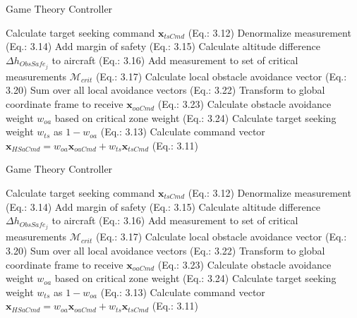 \begin{algorithm}
	\caption{Game Theory Controller}
	\begin{algorithmic}[1]
		\State Calculate target seeking command $\mathbf{x}_{tsCmd}$ (Eq.: 3.12)
		\State Denormalize measurement (Eq.: 3.14)
		\State Add margin of safety (Eq.: 3.15)
		\State Calculate altitude difference $\Delta h_{ObsSafe_{j}}$ to aircraft (Eq.: 3.16)
		\State Add measurement to set of critical measurements $\mathcal{M}_{crit}$ (Eq.: 3.17)
		\EndIf
		\EndFor
		\State Calculate local obstacle avoidance vector (Eq.: 3.20)
		\EndFor
		\State Sum over all local avoidance vectors (Eq.: 3.22)
		\State Transform to global coordinate frame to receive $\mathbf{x}_{oaCmd}$ (Eq.: 3.23)
		\State Calculate obstacle avoidance weight $w_{oa}$ based on critical zone weight (Eq.: 3.24)
		\State Calculate target seeking weight $w_{ts}$ as $1-w_{oa}$ (Eq.: 3.13)
		\State Calculate command vector $\mathbf{x}_{HSaCmd}=w_{oa}\mathbf{x}_{oaCmd}+w_{ts}\mathbf{x}_{tsCmd}$ (Eq.: 3.11)
		\EndFor
	\end{algorithmic} 
\end{algorithm} 

\begin{algorithm}
	\caption{Game Theory Controller}
	\begin{algorithmic}
		\State Calculate target seeking command $\mathbf{x}_{tsCmd}$ (Eq.: 3.12)
		\State Denormalize measurement (Eq.: 3.14)
		\State Add margin of safety (Eq.: 3.15)
		\State Calculate altitude difference $\Delta h_{ObsSafe_{j}}$ to aircraft (Eq.: 3.16)
		\State Add measurement to set of critical measurements $\mathcal{M}_{crit}$ (Eq.: 3.17)
		\EndIf
		\EndFor
		\State Calculate local obstacle avoidance vector (Eq.: 3.20)
		\EndFor
		\State Sum over all local avoidance vectors (Eq.: 3.22)
		\State Transform to global coordinate frame to receive $\mathbf{x}_{oaCmd}$ (Eq.: 3.23)
		\State Calculate obstacle avoidance weight $w_{oa}$ based on critical zone weight (Eq.: 3.24)
		\State Calculate target seeking weight $w_{ts}$ as $1-w_{oa}$ (Eq.: 3.13)
		\State Calculate command vector $\mathbf{x}_{HSaCmd}=w_{oa}\mathbf{x}_{oaCmd}+w_{ts}\mathbf{x}_{tsCmd}$ (Eq.: 3.11)
		\EndFor
	\end{algorithmic} 
\end{algorithm}
